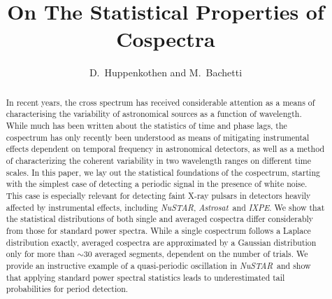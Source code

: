 \documentclass[12pt]{emulateapj}
\newcommand{\project}[1]{\textsl{#1}}
\newcommand{\nustar}{\project{NuSTAR}\xspace}
\newcommand{\astrosat}{\project{Astrosat}\xspace}
\newcommand{\ixpe}{\project{IXPE}\xspace}
\begin{document}
\title[On The Statistical Properties of Cospectra]{On The Statistical Properties of Cospectra}

\author{D.~Huppenkothen and M.~Bachetti}



\begin{abstract}
In recent years, the cross spectrum has received considerable attention as a means of characterising the variability of astronomical sources as a function of wavelength. While much has been written about the statistics of time and phase lags, the cospectrum has only recently been understood as means of mitigating instrumental effects dependent on temporal frequency in astronomical detectors, as well as a method of characterizing the coherent variability in two  wavelength ranges on different time scales. In this paper, we lay out the statistical foundations of the cospectrum, starting with the simplest case of detecting a periodic signal in the presence of white noise. This case is especially relevant for detecting faint X-ray pulsars in detectors heavily affected by instrumental effects, including \nustar, \astrosat\ and \ixpe. We show that the statistical distributions of both single and averaged cospectra differ considerably from those for standard power spectra. While a single cospectrum follows a Laplace distribution exactly, averaged cospectra are approximated by a Gaussian distribution only for more than $\sim\!\! 30$ averaged segments, dependent on the number of trials. We provide an instructive example of a quasi-periodic oscillation in \nustar\ and show that applying standard power spectral statistics leads to underestimated tail probabilities for period detection.

\end{abstract}

\end{document}

